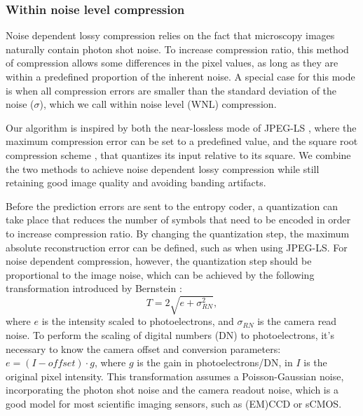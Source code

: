     \subsubsection{Within noise level compression}
    \label{sec:wnl}
    Noise dependent lossy compression relies on the fact that microscopy images naturally contain photon shot noise. To increase compression ratio, this method of compression allows some differences in the pixel values, as long as they are within a predefined proportion of the inherent noise. A special case for this mode is when all compression errors are smaller than the standard deviation of the noise ($\sigma$), which we call within noise level (WNL) compression.

    Our algorithm is inspired by both the near-lossless mode of JPEG-LS \cite{weinberger_loco-i_2000}, where the maximum compression error can be set to a predefined value, and the square root compression scheme \cite{gowen_square_2003, bernstein_noise_2010}, that quantizes its input relative to its square. We combine the two methods to achieve noise dependent lossy compression while still retaining good image quality and avoiding banding artifacts.

    Before the prediction errors are sent to the entropy coder, a quantization can take place that reduces the number of symbols that need to be encoded in order to increase compression ratio. By changing the quantization step, the maximum absolute reconstruction error can be defined, such as when using JPEG-LS. For noise dependent compression, however, the quantization step should be proportional to the image noise, which can be achieved by the following transformation introduced by Bernstein \etal \cite{bernstein_noise_2010}:
    \begin{equation}
      T = 2 \sqrt{e + \sigma^2_{RN}},
      \label{eq:wnl}
    \end{equation}    
    where $e$ is the intensity scaled to photoelectrons, and $\sigma_{RN}$ is the camera read noise. To perform the scaling of digital numbers (DN) to photoelectrons, it’s necessary to know the camera offset and conversion parameters: $e=(I-offset)\cdot g$, where $g$ is the gain in photoelectrons/DN, in $I$ is the original pixel intensity. This transformation assumes a Poisson-Gaussian noise, incorporating the photon shot noise and the camera readout noise, which is a good model for most scientific imaging sensors, such as (EM)CCD or sCMOS.

